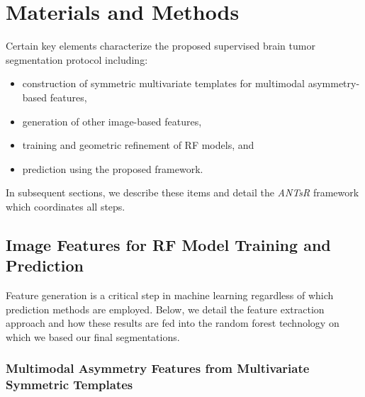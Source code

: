 \documentclass[preprint,authoryear,review,12pt]{elsarticle}
\begin{document}


%
%

\section{Materials and Methods}

Certain key elements characterize the proposed supervised brain tumor segmentation
protocol including:
\begin{itemize}
  \item construction of symmetric multivariate templates for multimodal 
        asymmetry-based features,
  \item generation of other image-based features,
  \item training and geometric refinement of RF models, and
  \item prediction using the proposed framework.
\end{itemize}
In subsequent sections, we describe these items and detail the
\textit{ANTsR} framework which coordinates all steps.

\subsection{Image Features for RF Model Training and Prediction}
Feature generation is a critical step in machine learning regardless
of which prediction methods are employed.  Below, we detail the
feature extraction approach and how these results are fed into the
random forest technology on which we based our final segmentations.

\subsubsection{Multimodal Asymmetry Features from Multivariate Symmetric Templates}

\setlength{\tabcolsep}{2pt}
\end{document}
